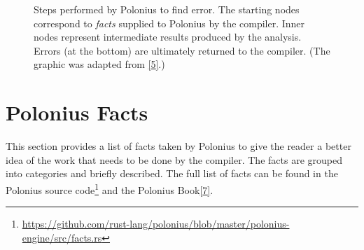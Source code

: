 \documentclass[
  11pt,
  twoside,symmetric]{report}
\DeclareRobustCommand{\href}[2]{#2\footnote{\url{#1}}}
\begin{document}
\begin{figure}
\centering

\caption{Steps performed by Polonius to find error. The starting nodes
correspond to \emph{facts} supplied to Polonius by the compiler. Inner
nodes represent intermediate results produced by the analysis. Errors
(at the bottom) are ultimately returned to the compiler. (The graphic
was adapted from \protect\hyperlink{ref-Stjerna2020}{{[}5{]}}.)}
\end{figure}

\hypertarget{polonius-facts}{%
\section{Polonius Facts}\label{polonius-facts}}

This section provides a list of facts taken by Polonius to give the
reader a better idea of the work that needs to be done by the compiler.
The facts are grouped into categories and briefly described. The full
list of facts can be found in the
\href{https://github.com/rust-lang/polonius/blob/master/polonius-engine/src/facts.rs}{Polonius
source code} and the Polonius
Book\protect\hyperlink{ref-polonius}{{[}7{]}}.
\end{document}
